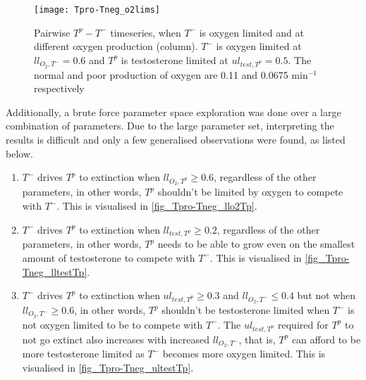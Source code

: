 \begin{figure}[h!]
  \centering
  \texttt{[image: Tpro-Tneg\_o2lims]}
  \caption[Pairwise $T^p - T^-$ timeseries, oxygen limitation]{Pairwise $T^p - T^-$ timeseries, when $T^-$ is oxygen limited and at different oxygen production (column). $T^-$ is oxygen limited at $ll_{O_2,T^-}=0.6$ and $T^p$ is testosterone limited at $ul_{test,T^p}=0.5$. The normal and poor production of oxygen are 0.11 and 0.0675 min$^{-1}$ respectively}
  \label{fig_Tpro-Tneg_o2lims}
\end{figure}

Additionally, a brute force parameter space exploration was done over a large combination of parameters. Due to the large parameter set, interpreting the results is difficult and only a few generalised observations were found, as listed below.
\begin{enumerate}
  \item $T^-$ drives $T^p$ to extinction when $ll_{O_2,T^p} \geq 0.6$, regardless of the other parameters, in other words, $T^p$ shouldn't be limited by oxygen to compete with $T^-$. This is visualised in \autoref{fig_Tpro-Tneg_llo2Tp}.
  \item $T^-$ drives $T^p$ to extinction when $ll_{test,T^p} \geq 0.2$, regardless of the other parameters, in other words, $T^p$ needs to be able to grow even on the smallest amount of testosterone to compete with $T^-$. This is visualised in \autoref{fig_Tpro-Tneg_lltestTp}.
  \item $T^-$ drives $T^p$ to extinction when $ul_{test,T^p} \geq 0.3$ and $ll_{O_2,T^-} \leq 0.4$ but not when $ll_{O_2,T^-} \geq 0.6$, in other words, $T^p$ shouldn't be testosterone limited when $T^-$ is not oxygen limited to be to compete with $T^-$. The $ul_{test,T^p}$ required for $T^p$ to not go extinct also increases with increased $ll_{O_2,T^-}$, that is, $T^p$ can afford to be more testosterone limited as $T^-$ becomes more oxygen limited. This is visualised in \autoref{fig_Tpro-Tneg_ultestTp}.
\end{enumerate}

